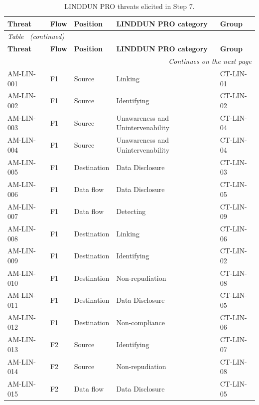 \begin{footnotesize}
\begin{longtable}{l l p{} p{} l}
    \caption[LINDDUN PRO threats elicited in Step 7]{LINDDUN PRO threats elicited in Step 7.}
    \label{tab:linddun_ameacas} \\
    \hline
    \textbf{Threat} & \textbf{Flow} & \textbf{Position} & \textbf{LINDDUN PRO category} & \textbf{Group} \\
    \hline
    \endfirsthead
    \multicolumn{5}{l}{\small\emph{Table~\thetable{} (continued)}} \\
    \hline
    \textbf{Threat} & \textbf{Flow} & \textbf{Position} & \textbf{LINDDUN PRO category} & \textbf{Group} \\
    \hline
    \endhead
    \hline
    \multicolumn{5}{r}{\small\emph{Continues on the next page}} \\
    \endfoot
    \hline
    \endlastfoot
        AM-LIN-001 & F1 & Source & Linking & CT-LIN-01 \\
        AM-LIN-002 & F1 & Source & Identifying & CT-LIN-02 \\
        AM-LIN-003 & F1 & Source & Unawareness and Unintervenability & CT-LIN-04 \\
        AM-LIN-004 & F1 & Source & Unawareness and Unintervenability & CT-LIN-04 \\
        AM-LIN-005 & F1 & Destination & Data Disclosure & CT-LIN-03 \\
        AM-LIN-006 & F1 & Data flow & Data Disclosure & CT-LIN-05 \\
        AM-LIN-007 & F1 & Data flow & Detecting & CT-LIN-09 \\
        AM-LIN-008 & F1 & Destination & Linking & CT-LIN-06 \\
        AM-LIN-009 & F1 & Destination & Identifying & CT-LIN-02 \\
        AM-LIN-010 & F1 & Destination & Non-repudiation & CT-LIN-08 \\
        AM-LIN-011 & F1 & Destination & Data Disclosure & CT-LIN-05 \\
        AM-LIN-012 & F1 & Destination & Non-compliance & CT-LIN-06 \\
        AM-LIN-013 & F2 & Source & Identifying & CT-LIN-07 \\
        AM-LIN-014 & F2 & Source & Non-repudiation & CT-LIN-08 \\
        AM-LIN-015 & F2 & Data flow & Data Disclosure & CT-LIN-05 \\

\end{longtable}
\end{footnotesize}
